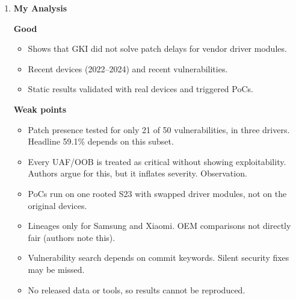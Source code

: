 \documentclass[11pt,a4paper]{article}
\newcommand{\entrypart}[1]{\textbf{\color{accent}#1}\par\vspace{2pt}}
\begin{document}
\begin{enumerate}
    \vspace{4pt}
    \textbf{Limitations (authors)}
    \begin{itemize}
        \item Mostly static. No full end-to-end exploit.
        \item Only a subset of drivers and devices. Results are estimates of real exploitability.
        \item Patch delays are lower bounds (gaps of months between firmware).
        \item No public repos for some drivers (Samsung NPU, camera; Xiaomi migt). Exynos excluded from ODM comparison.
        \item Fiber-like tools not adapted to kernel modules (future work).
        \item Datasets and tools not open-sourced (misuse risk).
    \end{itemize}

    \item \entrypart{My Analysis}

    \textbf{Good}
    \begin{itemize}
        \item Shows that GKI did not solve patch delays for vendor driver modules.
        \item Recent devices (2022--2024) and recent vulnerabilities.
        \item Static results validated with real devices and triggered PoCs.
    \end{itemize}

    \vspace{4pt}
    \textbf{Weak points}
    \begin{itemize}
        \item Patch presence tested for only 21 of 50 vulnerabilities, in three drivers. Headline 59.1\% depends on this subset.
        \item Every UAF/OOB is treated as critical without showing exploitability. Authors argue for this, but it inflates severity. Observation.
        \item PoCs run on one rooted S23 with swapped driver modules, not on the original devices.
        \item Lineages only for Samsung and Xiaomi. OEM comparisons not directly fair (authors note this).
        \item Vulnerability search depends on commit keywords. Silent security fixes may be missed.
        \item No released data or tools, so results cannot be reproduced.
    \end{itemize}


\end{enumerate}
\end{document}
